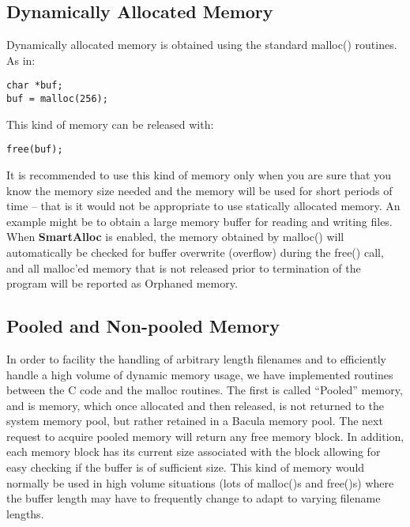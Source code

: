 \subsection{Dynamically Allocated Memory}

Dynamically allocated memory is obtained using the standard malloc() routines.
As in:

\footnotesize
\begin{verbatim}
char *buf;
buf = malloc(256);
\end{verbatim}
\normalsize

This kind of memory can be released with:

\footnotesize
\begin{verbatim}
free(buf);
\end{verbatim}
\normalsize

It is recommended to use this kind of memory only when you are sure that you
know the memory size needed and the memory will be used for short periods of
time -- that is it would not be appropriate to use statically allocated
memory. An example might be to obtain a large memory buffer for reading and
writing files. When {\bf SmartAlloc} is enabled, the memory obtained by
malloc() will automatically be checked for buffer overwrite (overflow) during
the free() call, and all malloc'ed memory that is not released prior to
termination of the program will be reported as Orphaned memory.

\subsection{Pooled and Non-pooled Memory}

In order to facility the handling of arbitrary length filenames and to
efficiently handle a high volume of dynamic memory usage, we have implemented
routines between the C code and the malloc routines. The first is called
``Pooled'' memory, and is memory, which once allocated and then released, is
not returned to the system memory pool, but rather retained in a Bacula memory
pool. The next request to acquire pooled memory will return any free memory
block. In addition, each memory block has its current size associated with the
block allowing for easy checking if the buffer is of sufficient size. This
kind of memory would normally be used in high volume situations (lots of
malloc()s and free()s) where the buffer length may have to frequently change
to adapt to varying filename lengths.

